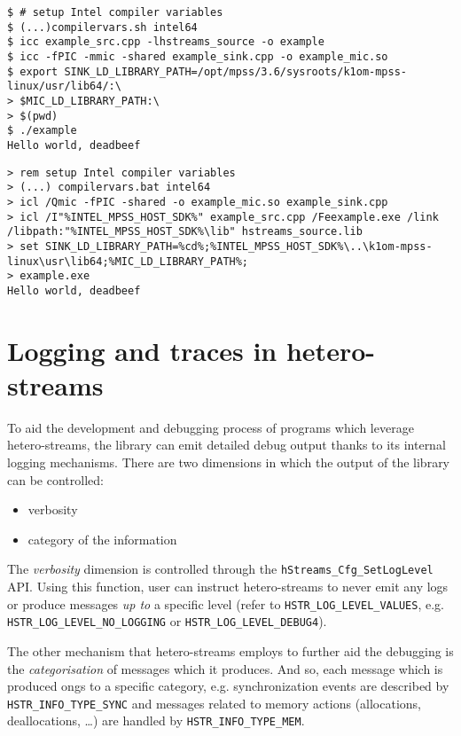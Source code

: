 \documentclass[a4,oneside]{book}
\begin{document}
\begin{lstlisting}[style=BashCmdListingStyle,caption={Compiling and running the example on Linux},frame=tlrb,label={lst:running-example-linux}]
$ # setup Intel compiler variables
$ (...)compilervars.sh intel64
$ icc example_src.cpp -lhstreams_source -o example
$ icc -fPIC -mmic -shared example_sink.cpp -o example_mic.so
$ export SINK_LD_LIBRARY_PATH=/opt/mpss/3.6/sysroots/k1om-mpss-linux/usr/lib64/:\
> $MIC_LD_LIBRARY_PATH:\
> $(pwd)
$ ./example
Hello world, deadbeef
\end{lstlisting}

\begin{lstlisting}[style=BatchListingStyle,caption={Compiling and running the example on Windows},frame=tlrb,label={lst:running-example-windows}]
> rem setup Intel compiler variables
> (...) compilervars.bat intel64
> icl /Qmic -fPIC -shared -o example_mic.so example_sink.cpp
> icl /I"%INTEL_MPSS_HOST_SDK%" example_src.cpp /Feexample.exe /link /libpath:"%INTEL_MPSS_HOST_SDK%\lib" hstreams_source.lib
> set SINK_LD_LIBRARY_PATH=%cd%;%INTEL_MPSS_HOST_SDK%\..\k1om-mpss-linux\usr\lib64;%MIC_LD_LIBRARY_PATH%;
> example.exe
Hello world, deadbeef
\end{lstlisting}

\section{Logging and traces in hetero-streams}
To aid the development and debugging process of programs which leverage hetero-streams, the library can emit detailed debug output thanks to its internal logging mechanisms.
There are two dimensions in which the output of the library can be controlled:
\begin{itemize}
    \item verbosity
    \item category of the information
\end{itemize}

The \emph{verbosity} dimension is controlled through the \texttt{hStreams\_Cfg\_SetLogLevel} API.
Using this function, user can instruct hetero-streams to never emit any logs or produce messages \emph{up to} a specific level (refer to \texttt{HSTR\_LOG\_LEVEL\_VALUES}, e.g. \texttt{HSTR\_LOG\_LEVEL\_NO\_LOGGING} or \texttt{HSTR\_LOG\_LEVEL\_DEBUG4}).

The other mechanism that hetero-streams employs to further aid the debugging is the \emph{categorisation} of messages which it produces.
And so, each message which is produced ongs to a specific category, e.g. synchronization events are described by \texttt{HSTR\_INFO\_TYPE\_SYNC} and messages related to memory actions (allocations, deallocations, \ldots) are handled by \texttt{HSTR\_INFO\_TYPE\_MEM}.
\end{document}
